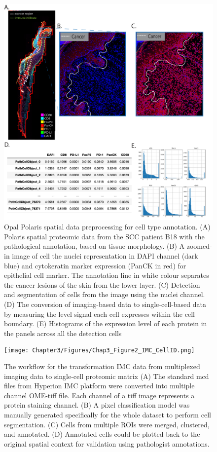 \begin{figure}[htp]
    \centering
    \includegraphics[width=\columnwidth]{Chapter3/Figures/Chap3_Figure1_1.png}
    \caption[Schematic of spatial data preprocessing for cell type annotation.]{ Opal Polaris spatial data preprocessing for cell type annotation. (A) Polaris spatial proteomic data from the SCC patient B18 with the pathological annotation, based on tissue morphology. (B) A zoomed-in image of cell the nuclei representation in DAPI channel (dark blue) and cytokeratin marker expression (PanCK in red) for epithelial cell marker. The annotation line in white colour separates the cancer lesions of the skin from the lower layer. (C) Detection and segmentation of cells from the image using the nuclei channel. (D) The conversion of imaging-based data to single-cell-based data by measuring the level signal each cell expresses within the cell boundary. (E) Histograms of the expression level of each protein in the panels across all the detection cells}
    \label{fig:Polaris_skin_cancer_preprocessing}
\end{figure}

\begin{figure}[htp]
    \centering
    \texttt{[image: Chapter3/Figures/Chap3\_Figure2\_IMC\_CellID.png]}
    \caption[Hyperion Imaging Mass Cytometry cell identification process]{The workflow for the transformation IMC data from multiplexed imaging data to single-cell proteomic matrix (A) The standard mcd files from Hyperion IMC platform were converted into multiple channel OME-tiff file. Each channel of a tiff image represents a protein staining channel. (B) A pixel classification model was manually generated specifically for the whole dataset to perform cell segmentation. (C) Cells from multiple ROIs were merged, clustered, and annotated. (D) Annotated cells could be plotted back to the original spatial context for validation using pathologist annotations.}
    \label{Chap3:fig:IMC_cell_type_annotation}
\end{figure}

